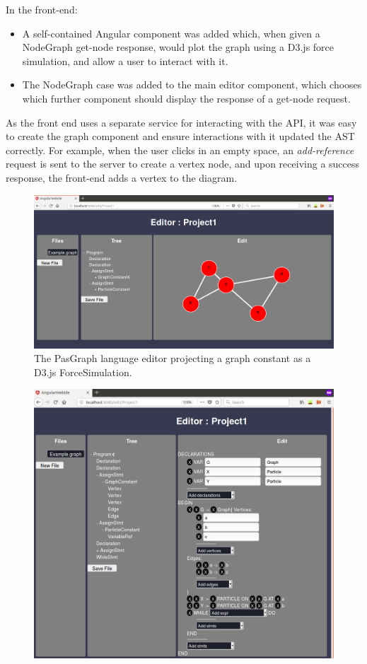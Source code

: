 \documentclass{article}
\begin{document}
{\begin{itemize}
\end{itemize}
In the front-end:
\begin{itemize}
\item A self-contained Angular component was added which, when given a NodeGraph get-node response, would plot the graph using a D3.js force simulation, and allow a user to interact with it.
\item The NodeGraph case was added to the main editor component, which chooses which further component should display the response of a get-node request.
\end{itemize}
As the front end uses a separate service for interacting with the API, it was easy to create the graph component and ensure interactions with it updated the AST correctly. For example, when the user clicks in an empty space, an \emph{add-reference} request is sent to the server to create a vertex node, and upon receiving a success response, the front-end adds a vertex to the diagram.
\begin{figure}[h!]
  \centering
  \includegraphics[width=\linewidth]{./Screenshots/graphUIgraph2narrow.png}
  \caption{The PasGraph language editor projecting a graph constant as a D3.js ForceSimulation.}
  \label{fig:pasgraphUI2}
\end{figure}
\begin{figure}[h!]
  \centering
  \includegraphics[width=\linewidth]{./Screenshots/graphUI3Narrow2.png}

\end{figure}}
\end{document}
